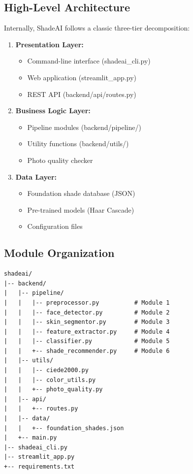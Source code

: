 \subsection{High-Level Architecture}

Internally, ShadeAI follows a classic three-tier decomposition:

\begin{enumerate}
    \item \textbf{Presentation Layer:}
    \begin{itemize}
        \item Command-line interface (shadeai\_cli.py)
        \item Web application (streamlit\_app.py)
        \item REST API (backend/api/routes.py)
    \end{itemize}
    
    \item \textbf{Business Logic Layer:}
    \begin{itemize}
        \item Pipeline modules (backend/pipeline/)
        \item Utility functions (backend/utils/)
        \item Photo quality checker
    \end{itemize}
    
    \item \textbf{Data Layer:}
    \begin{itemize}
        \item Foundation shade database (JSON)
        \item Pre-trained models (Haar Cascade)
        \item Configuration files
    \end{itemize}
\end{enumerate}

\subsection{Module Organization}

\begin{verbatim}
shadeai/
|-- backend/
|   |-- pipeline/
|   |   |-- preprocessor.py          # Module 1
|   |   |-- face_detector.py         # Module 2
|   |   |-- skin_segmentor.py        # Module 3
|   |   |-- feature_extractor.py     # Module 4
|   |   |-- classifier.py            # Module 5
|   |   +-- shade_recommender.py     # Module 6
|   |-- utils/
|   |   |-- ciede2000.py
|   |   |-- color_utils.py
|   |   +-- photo_quality.py
|   |-- api/
|   |   +-- routes.py
|   |-- data/
|   |   +-- foundation_shades.json
|   +-- main.py
|-- shadeai_cli.py
|-- streamlit_app.py
+-- requirements.txt
\end{verbatim}

